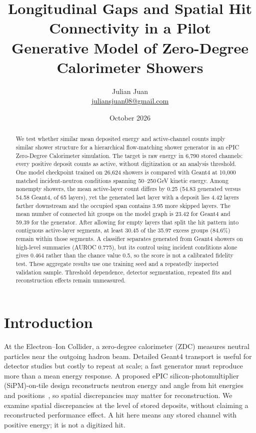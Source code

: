 \documentclass[10pt]{article}
\title{Longitudinal Gaps and Spatial Hit Connectivity in a Pilot\\Generative Model of Zero-Degree Calorimeter Showers}
\author{Julian Juan\\[3pt]\small\href{mailto:juliansjuan08@gmail.com}{juliansjuan08@gmail.com}}
\date{October 2026}
\begin{document}
\maketitle

\begin{abstract}
We test whether similar mean deposited energy and active-channel counts imply similar shower structure for a hierarchical flow-matching shower generator in an ePIC Zero-Degree Calorimeter simulation. The target is raw energy in 6,790 stored channels: every positive deposit counts as active, without digitization or an analysis threshold. One model checkpoint trained on 26,624 showers is compared with Geant4 at 10,000 matched incident-neutron conditions spanning 50--250\,GeV kinetic energy. Among nonempty showers, the mean active-layer count differs by 0.25 (54.83 generated versus 54.58 Geant4, of 65 layers), yet the generated last layer with a deposit lies 4.42 layers farther downstream and the occupied span contains 3.95 more skipped layers. The mean number of connected hit groups on the model graph is 23.42 for Geant4 and 59.39 for the generator. After allowing for empty layers that split the hit pattern into contiguous active-layer segments, at least 30.45 of the 35.97 excess groups (84.6\%) remain within those segments. A classifier separates generated from Geant4 showers on high-level summaries (AUROC 0.775), but its control using incident conditions alone gives 0.464 rather than the chance value 0.5, so the score is not a calibrated fidelity test. These aggregate results use one training seed and a repeatedly inspected validation sample. Threshold dependence, detector segmentation, repeated fits and reconstruction effects remain unmeasured.
\end{abstract}

\section{Introduction}

At the Electron--Ion Collider, a zero-degree calorimeter (ZDC) measures neutral particles near the outgoing hadron beam. Detailed Geant4 transport is useful for detector studies but costly to repeat at scale; a fast generator must reproduce more than a mean energy response. A proposed ePIC silicon-photomultiplier (SiPM)-on-tile design reconstructs neutron energy and angle from hit energies and positions~\cite{epiczdc}, so spatial discrepancies may matter for reconstruction. We examine spatial discrepancies at the level of stored deposits, without claiming a reconstructed performance effect. A hit here means any stored channel with positive energy; it is not a digitized hit.
\end{document}

